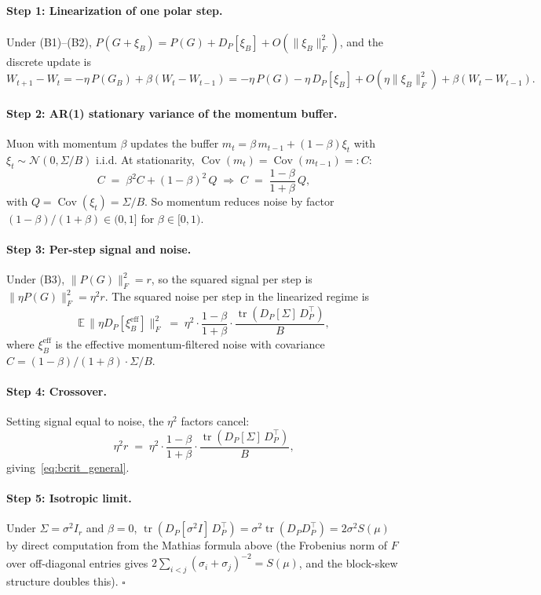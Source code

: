 \documentclass{article}
\begin{document}
\paragraph{Step 1: Linearization of one polar step.}
Under (B1)--(B2), $P(G+\xi_B) = P(G) + D_P[\xi_B] + O(\|\xi_B\|_F^2)$, and the discrete update is
\[
W_{t+1} - W_t = -\eta\,P(G_B) + \beta(W_t - W_{t-1}) = -\eta\,P(G) - \eta\,D_P[\xi_B] + O(\eta\|\xi_B\|_F^2) + \beta(W_t-W_{t-1}).
\]

\paragraph{Step 2: AR(1) stationary variance of the momentum buffer.}
Muon with momentum $\beta$ updates the buffer $m_t = \beta\,m_{t-1} + (1-\beta)\xi_t$ with $\xi_t\sim\mathcal N(0,\Sigma/B)$ i.i.d. At stationarity, $\operatorname{Cov}(m_t)=\operatorname{Cov}(m_{t-1})=:C$:
\[
C \;=\; \beta^2 C + (1-\beta)^2\,Q
\;\Longrightarrow\;
C \;=\; \frac{1-\beta}{1+\beta}\,Q,
\]
with $Q=\operatorname{Cov}(\xi_t)=\Sigma/B$. So momentum reduces noise by factor $(1-\beta)/(1+\beta)\in(0,1]$ for $\beta\in[0,1)$.

\paragraph{Step 3: Per-step signal and noise.}
Under (B3), $\|P(G)\|_F^2 = r$, so the squared signal per step is $\|\eta P(G)\|_F^2 = \eta^2 r$. The squared noise per step in the linearized regime is
\[
\mathbb E\,\|\eta D_P[\xi_B^{\mathrm{eff}}]\|_F^2 \;=\; \eta^2\cdot\frac{1-\beta}{1+\beta}\cdot\frac{\operatorname{tr}(D_P[\Sigma]\,D_P^\top)}{B},
\]
where $\xi_B^{\mathrm{eff}}$ is the effective momentum-filtered noise with covariance $C=(1-\beta)/(1+\beta)\cdot\Sigma/B$.

\paragraph{Step 4: Crossover.}
Setting signal equal to noise, the $\eta^2$ factors cancel:
\[
\eta^2 r \;=\; \eta^2\cdot\frac{1-\beta}{1+\beta}\cdot\frac{\operatorname{tr}(D_P[\Sigma]\,D_P^\top)}{B},
\]
giving~\eqref{eq:bcrit_general}.

\paragraph{Step 5: Isotropic limit.}
Under $\Sigma=\sigma^2 I_r$ and $\beta=0$, $\operatorname{tr}(D_P[\sigma^2 I]\,D_P^\top) = \sigma^2\operatorname{tr}(D_P D_P^\top) = 2\sigma^2 S(\mu)$ by direct computation from the Mathias formula above (the Frobenius norm of $F$ over off-diagonal entries gives $2\sum_{i<j}(\sigma_i+\sigma_j)^{-2}=S(\mu)$, and the block-skew structure doubles this). \hfill$\square$
\end{document}
